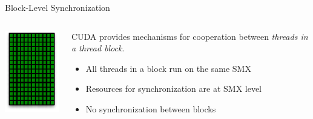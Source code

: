 \begin{frame}[fragile]{Block-Level Synchronization}
    \begin{columns}[T]
        \begin{column}{0.3\textwidth}
            \includegraphics[width=\textwidth]{./images/smx.pdf}
        \end{column}

        \begin{column}{0.7\textwidth}
            CUDA provides mechanisms for cooperation between \emph{threads in a thread block}.
            \begin{itemize}
                \item All threads in a block run on the same SMX
                \item Resources for synchronization are at SMX level
                \item No synchronization between blocks
            \end{itemize}
        \end{column}
    \end{columns}

\end{frame}

